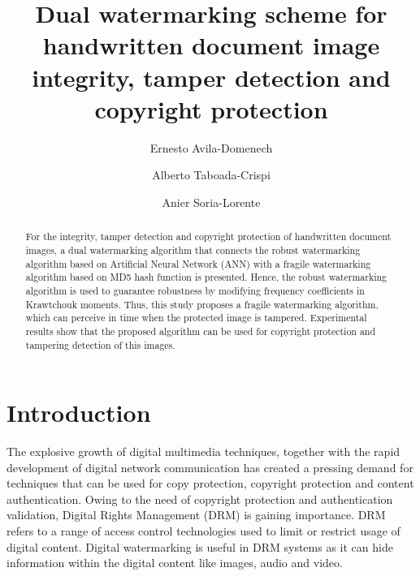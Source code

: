 \documentclass[runningheads]{llncs}
\begin{document}
%
\title{Dual watermarking scheme for handwritten document image integrity, tamper detection and copyright protection}
%
%
\author{Ernesto Avila-Domenech \and
Alberto Taboada-Crispi \and
Anier Soria-Lorente}
%
%
%
\maketitle              %
%
\begin{abstract}
For the integrity, tamper detection and copyright protection of handwritten document images, a dual watermarking algorithm that connects the robust watermarking algorithm based on Artificial Neural Network (ANN) with a fragile watermarking algorithm based on MD5 hash function is presented. Hence, the robust watermarking algorithm is used to guarantee robustness by modifying frequency coefficients in Krawtchouk moments. Thus, this study proposes a fragile watermarking algorithm, which can perceive in time when the protected image is tampered. Experimental results show that the proposed algorithm can be used for copyright protection and tampering detection of this images.

\end{abstract}
%
%
%
\section{Introduction}
The explosive growth of digital multimedia techniques, together with the rapid development of digital network communication has created a pressing demand for techniques that can be used for copy protection, copyright protection and content authentication. Owing to the need of copyright protection and authentication validation, Digital Rights Management (DRM) is gaining importance. DRM refers to a range of access control technologies used to limit or restrict usage of digital content. Digital watermarking is useful in DRM systems as it can hide information within the digital content like images, audio and video.
\end{document}
